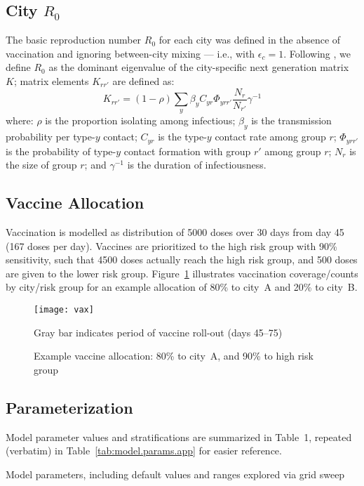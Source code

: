 \subsection{City $R_0$}\label{app.model.R0}
The basic reproduction number $R_0$ for each city was defined
in the absence of vaccination and ignoring between-city mixing --- i.e., with $\epsilon_c = 1$.
Following \cite{Diekmann1990}, we define $R_0$ as
the dominant eigenvalue of the city-specific next generation matrix $K$;
matrix elements $K_{rr'}$ are defined as:
\begin{equation}
  K_{rr'} = (1 - \rho) \sum_{y} \beta_{y} C_{yr} \Phi_{yrr'} \frac{N_{r}} {N_{r'}} \gamma^{-1}
\end{equation}
where:
$\rho$ is the proportion isolating among infectious;
$\beta_{y}$ is the transmission probability per type-$y$ contact;
$C_{yr}$ is the type-$y$ contact rate among group $r$;
$\Phi_{yrr'}$ is the probability of type-$y$ contact formation with group $r'$ among group $r$;
$N_{r}$ is the size of group $r$; and
$\gamma^{-1}$ is the duration of infectiousness.
\subsection{Vaccine Allocation}\label{app.model.vax}
Vaccination is modelled as distribution of 5000 doses over 30 days from day 45 (167 doses per day).
Vaccines are prioritized to the high risk group with 90\% sensitivity, such that
4500 doses actually reach the high risk group, and
500 doses are given to the lower risk group.
Figure~\ref{fig:prev.vax} illustrates vaccination coverage/counts by city/risk group
for an example allocation of 80\% to city~A and 20\% to city~B.
\begin{figure}[h]
  \texttt{[image: vax]}
  \caption{Example vaccine allocation: 80\% to city~A, and 90\% to high risk group}
  \label{fig:prev.vax}
  \floatfoot
  Gray bar indicates period of vaccine roll-out (days 45--75)
\end{figure}
\subsection{Parameterization}\label{app.model.param}
Model parameter values and stratifications are summarized in Table~1,
repeated (verbatim) in Table~\ref{tab:model.params.app} for easier reference.
\begin{table}
  \centering
  \caption{Model parameters, including default values and ranges explored via grid sweep}
  \label{tab:model.params.app}
  
\end{table}
